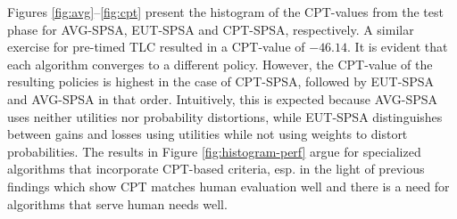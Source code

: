 Figures \ref{fig:avg}--\ref{fig:cpt} present the histogram of the CPT-values from the test phase for AVG-SPSA, EUT-SPSA and CPT-SPSA, respectively.  A similar exercise for pre-timed TLC resulted in a CPT-value of $-46.14$. It is evident that each algorithm converges to a different policy. However, the CPT-value of the resulting policies is highest in the case of CPT-SPSA, followed by EUT-SPSA and AVG-SPSA in that order. Intuitively, this is expected because AVG-SPSA uses neither utilities nor probability distortions, while EUT-SPSA distinguishes between gains and losses using utilities while not using weights to distort probabilities.
The results in Figure \ref{fig:histogram-perf} argue for specialized algorithms that incorporate CPT-based criteria, esp. in the light of previous findings which show CPT matches human evaluation well and there is a need for algorithms that serve human needs well.



